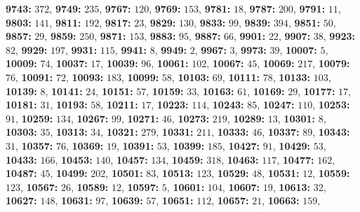 \textsf{\bfseries 9743:} $372$, \textsf{\bfseries 9749:} $235$, \textsf{\bfseries 9767:} $120$, \textsf{\bfseries 9769:} $153$, \textsf{\bfseries 9781:} $18$, \textsf{\bfseries 9787:} $200$, \textsf{\bfseries 9791:} $11$, \textsf{\bfseries 9803:} $141$, \textsf{\bfseries 9811:} $192$, \textsf{\bfseries 9817:} $23$, \textsf{\bfseries 9829:} $130$, \textsf{\bfseries 9833:} $99$, \textsf{\bfseries 9839:} $394$, \textsf{\bfseries 9851:} $50$, \textsf{\bfseries 9857:} $29$, \textsf{\bfseries 9859:} $250$, \textsf{\bfseries 9871:} $153$, \textsf{\bfseries 9883:} $95$, \textsf{\bfseries 9887:} $66$, \textsf{\bfseries 9901:} $22$, \textsf{\bfseries 9907:} $38$, \textsf{\bfseries 9923:} $82$, \textsf{\bfseries 9929:} $197$, \textsf{\bfseries 9931:} $115$, \textsf{\bfseries 9941:} $8$, \textsf{\bfseries 9949:} $2$, \textsf{\bfseries 9967:} $3$, \textsf{\bfseries 9973:} $39$, \textsf{\bfseries 10007:} $5$, \textsf{\bfseries 10009:} $74$, \textsf{\bfseries 10037:} $17$, \textsf{\bfseries 10039:} $96$, \textsf{\bfseries 10061:} $102$, \textsf{\bfseries 10067:} $45$, \textsf{\bfseries 10069:} $217$, \textsf{\bfseries 10079:} $76$, \textsf{\bfseries 10091:} $72$, \textsf{\bfseries 10093:} $183$, \textsf{\bfseries 10099:} $58$, \textsf{\bfseries 10103:} $69$, \textsf{\bfseries 10111:} $78$, \textsf{\bfseries 10133:} $103$, \textsf{\bfseries 10139:} $8$, \textsf{\bfseries 10141:} $24$, \textsf{\bfseries 10151:} $57$, \textsf{\bfseries 10159:} $33$, \textsf{\bfseries 10163:} $61$, \textsf{\bfseries 10169:} $29$, \textsf{\bfseries 10177:} $17$, \textsf{\bfseries 10181:} $31$, \textsf{\bfseries 10193:} $58$, \textsf{\bfseries 10211:} $17$, \textsf{\bfseries 10223:} $114$, \textsf{\bfseries 10243:} $85$, \textsf{\bfseries 10247:} $110$, \textsf{\bfseries 10253:} $91$, \textsf{\bfseries 10259:} $134$, \textsf{\bfseries 10267:} $99$, \textsf{\bfseries 10271:} $46$, \textsf{\bfseries 10273:} $219$, \textsf{\bfseries 10289:} $13$, \textsf{\bfseries 10301:} $8$, \textsf{\bfseries 10303:} $35$, \textsf{\bfseries 10313:} $34$, \textsf{\bfseries 10321:} $279$, \textsf{\bfseries 10331:} $211$, \textsf{\bfseries 10333:} $46$, \textsf{\bfseries 10337:} $89$, \textsf{\bfseries 10343:} $31$, \textsf{\bfseries 10357:} $76$, \textsf{\bfseries 10369:} $19$, \textsf{\bfseries 10391:} $53$, \textsf{\bfseries 10399:} $185$, \textsf{\bfseries 10427:} $91$, \textsf{\bfseries 10429:} $53$, \textsf{\bfseries 10433:} $166$, \textsf{\bfseries 10453:} $140$, \textsf{\bfseries 10457:} $134$, \textsf{\bfseries 10459:} $318$, \textsf{\bfseries 10463:} $117$, \textsf{\bfseries 10477:} $162$, \textsf{\bfseries 10487:} $45$, \textsf{\bfseries 10499:} $202$, \textsf{\bfseries 10501:} $83$, \textsf{\bfseries 10513:} $123$, \textsf{\bfseries 10529:} $48$, \textsf{\bfseries 10531:} $12$, \textsf{\bfseries 10559:} $123$, \textsf{\bfseries 10567:} $26$, \textsf{\bfseries 10589:} $12$, \textsf{\bfseries 10597:} $5$, \textsf{\bfseries 10601:} $104$, \textsf{\bfseries 10607:} $19$, \textsf{\bfseries 10613:} $32$, \textsf{\bfseries 10627:} $148$, \textsf{\bfseries 10631:} $97$, \textsf{\bfseries 10639:} $57$, \textsf{\bfseries 10651:} $112$, \textsf{\bfseries 10657:} $21$, \textsf{\bfseries 10663:} $159$, 
